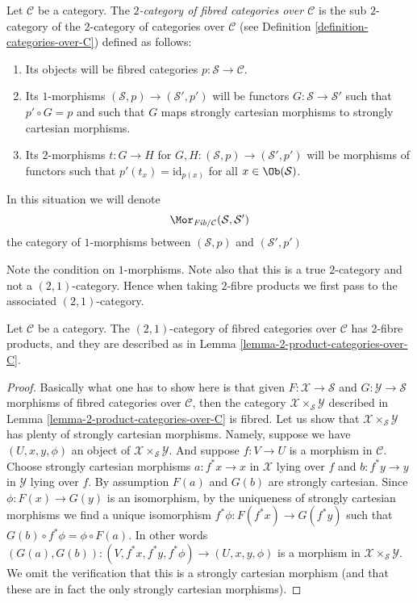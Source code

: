 \begin{definition}
\label{definition-fibred-categories-over-C}
Let $\mathcal{C}$ be a category.
The {\it $2$-category of fibred categories over $\mathcal{C}$}
is the sub $2$-category of the $2$-category of categories
over $\mathcal{C}$ (see Definition \ref{definition-categories-over-C})
defined as follows:
\begin{enumerate}
\item Its objects will be fibred categories
$p : \mathcal{S} \to \mathcal{C}$.
\item Its $1$-morphisms $(\mathcal{S}, p) \to (\mathcal{S}', p')$
will be functors $G : \mathcal{S} \to \mathcal{S}'$ such that
$p' \circ G = p$ and such that $G$ maps strongly cartesian
morphisms to strongly cartesian morphisms.
\item Its $2$-morphisms $t : G \to H$ for
$G, H : (\mathcal{S}, p) \to (\mathcal{S}', p')$
will be morphisms of functors
such that $p'(t_x) = \text{id}_{p(x)}$
for all $x \in \Ob(\mathcal{S})$.
\end{enumerate}
In this situation we will denote
$$
\Mor_{\textit{Fib}/\mathcal{C}}(\mathcal{S}, \mathcal{S}')
$$
the category of $1$-morphisms between
$(\mathcal{S}, p)$ and $(\mathcal{S}', p')$
\end{definition}

\noindent
Note the condition on $1$-morphisms.
Note also that this is a true $2$-category and
not a $(2, 1)$-category. Hence when taking $2$-fibre
products we first pass to the associated $(2, 1)$-category.

\begin{lemma}
\label{lemma-2-product-fibred-categories-over-C}
Let $\mathcal{C}$ be a category.
The $(2, 1)$-category of fibred categories
over $\mathcal{C}$ has 2-fibre products, and
they are described as in
Lemma \ref{lemma-2-product-categories-over-C}.
\end{lemma}

\begin{proof}
Basically what one has to show here is that given
$F : \mathcal{X} \to \mathcal{S}$ and
$G : \mathcal{Y} \to \mathcal{S}$ morphisms of fibred
categories over $\mathcal{C}$, then the category
$\mathcal{X} \times_\mathcal{S} \mathcal{Y}$
described in Lemma \ref{lemma-2-product-categories-over-C} is fibred.
Let us show that $\mathcal{X} \times_\mathcal{S} \mathcal{Y}$
has plenty of strongly cartesian morphisms.
Namely, suppose we have $(U, x, y, \phi)$ an object of
$\mathcal{X} \times_\mathcal{S} \mathcal{Y}$.
And suppose $f : V \to U$ is a morphism in $\mathcal{C}$.
Choose strongly cartesian morphisms $a : f^*x \to x$ in $\mathcal{X}$
lying over $f$ and $b : f^*y \to y$ in $\mathcal{Y}$ lying over $f$.
By assumption $F(a)$ and $G(b)$ are strongly cartesian.
Since $\phi : F(x) \to G(y)$ is an isomorphism, by the uniqueness
of strongly cartesian morphisms we find a unique isomorphism
$f^*\phi : F(f^*x) \to G(f^*y)$ such that
$G(b) \circ f^*\phi = \phi \circ F(a)$. In other words
$(G(a), G(b)) : (V, f^*x, f^*y, f^*\phi) \to (U, x, y, \phi)$
is a morphism in $\mathcal{X} \times_\mathcal{S} \mathcal{Y}$.
We omit the verification that this is a strongly cartesian morphism
(and that these are in fact the only strongly cartesian morphisms).
\end{proof}

